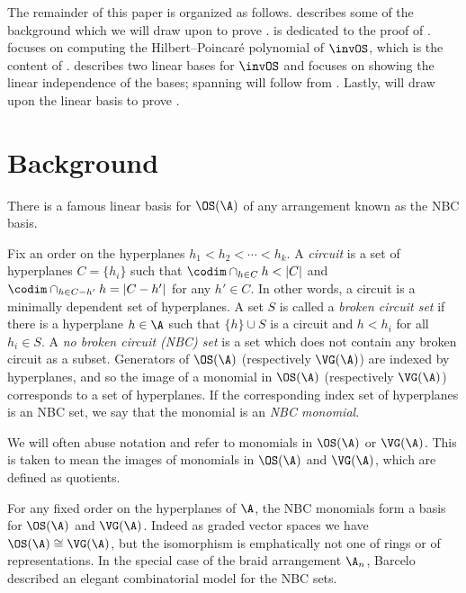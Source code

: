 \documentclass{amsart}
\begin{document}
The remainder of this paper is organized as follows.
 describes some of the background which we will draw upon to prove .
 is dedicated to the proof of .
 focuses on computing the Hilbert--Poincar\'e polynomial of $\invOS$, which is the content of . 
 describes two linear bases for $\invOS$ and focuses on showing the linear independence of the bases; spanning will follow from .
Lastly,  will draw upon the linear basis to prove .

\section{Background}\label{sec:Background}

There is a famous linear basis for $\OS(\A)$ of any arrangement known as the NBC basis.
\begin{definition}
    Fix an order on the hyperplanes $h_1 < h_2 < \cdots < h_k$.
    A \textit{circuit} is a set of hyperplanes $C = \{h_i\}$ such that $\codim \cap_{h \in C} h < |C|$ and $\codim \cap_{h \in C-h'} h = |C-h'|$ for any $h' \in C$.
    In other words, a circuit is a minimally dependent set of hyperplanes.
    A set $S$ is called a \textit{broken circuit set} if there is a hyperplane $h \in \A$ such that $ \{h\} \cup S$ is a circuit and $h < h_i$ for all $h_i \in S$.
    A \textit{no broken circuit (NBC) set} is a set which does not contain any broken circuit as a subset.
    Generators of $\OS(\A)$ (respectively $\VG(\A)$) are indexed by hyperplanes, and so the image of a monomial in $\OS(\A)$ (respectively $\VG(\A)$) corresponds to a set of hyperplanes. 
    If the corresponding index set of hyperplanes is an NBC set, we say that the monomial is an \textit{NBC monomial}.
\end{definition}

\begin{remark}
    We will often abuse notation and refer to monomials in $\OS(\A)$ or $\VG(\A)$. 
    This is taken to mean the images of monomials in $\OS(\A)$ and $\VG(\A)$, which are defined as quotients. 
\end{remark}

For any fixed order on the hyperplanes of $\A$, the NBC monomials form a basis for $\OS(\A)$ and $\VG(\A)$. Indeed as graded vector spaces we have $\OS(\A) \cong \VG(\A)$, but the isomorphism is emphatically not one of rings or of representations.
In the special case of the braid arrangement $\A_n$, Barcelo \cite[{Theorem~5.1}]{barcelo} described an elegant combinatorial model for the NBC sets.
\end{document}
